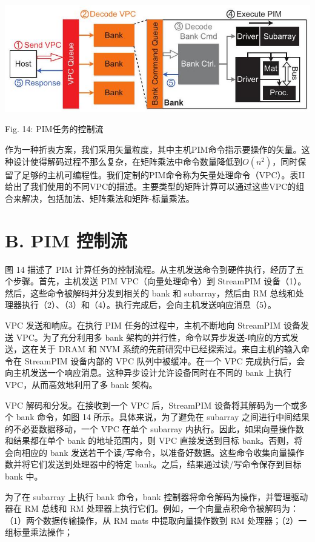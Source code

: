 \documentclass[10pt]{article}
\begin{document}
\begin{center}
\includegraphics[max width=\textwidth]{2024_05_12_abeba8a85da5b5ec4c7bg-08(1)}
\end{center}

Fig. 14: PIM任务的控制流

作为一种折衷方案，我们采用矢量粒度，其中主机PIM命令指示要操作的矢量。这种设计使得解码过程不那么复杂，在矩阵乘法中命令数量降低到$O(n^2)$，同时保留了足够的主机可编程性。我们定制的PIM命令称为矢量处理命令（VPC）。表II给出了我们使用的不同VPC的描述。主要类型的矩阵计算可以通过这些VPC的组合来解决，包括加法、矩阵乘法和矩阵-标量乘法。

\section*{B. PIM 控制流}
图 14 描述了 PIM 计算任务的控制流程。从主机发送命令到硬件执行，经历了五个步骤。首先，主机发送 PIM VPC（向量处理命令）到 StreamPIM 设备（1）。然后，这些命令被解码并分发到相关的 bank 和 subarray，然后由 RM 总线和处理器执行（2）、（3）和（4）。执行完成后，会向主机发送响应消息（5）。

VPC 发送和响应。在执行 PIM 任务的过程中，主机不断地向 StreamPIM 设备发送 VPC。为了充分利用多 bank 架构的并行性，命令以异步发送-响应的方式发送，这在关于 DRAM 和 NVM 系统的先前研究中已经探索过。来自主机的输入命令在 StreamPIM 设备内部的 VPC 队列中被缓冲。在一个 VPC 完成执行后，会向主机发送一个响应消息。这种异步设计允许设备同时在不同的 bank 上执行 VPC，从而高效地利用了多 bank 架构。

VPC 解码和分发。在接收到一个 VPC 后，StreamPIM 设备将其解码为一个或多个 bank 命令，如图 14 所示。具体来说，为了避免在 subarray 之间进行中间结果的不必要数据移动，一个 VPC 在单个 subarray 内执行。因此，如果向量操作数和结果都在单个 bank 的地址范围内，则 VPC 直接发送到目标 bank。否则，将会向相应的 bank 发送若干个读/写命令，以准备好数据。这些命令收集向量操作数并将它们发送到处理器中的特定 bank。之后，结果通过读/写命令保存到目标 bank 中。

为了在 subarray 上执行 bank 命令，bank 控制器将命令解码为操作，并管理驱动器在 RM 总线和 RM 处理器上执行它们。例如，一个向量点积命令被解码为：（1）两个数据传输操作，从 RM mats 中提取向量操作数到 RM 处理器；（2）一组标量乘法操作；
\end{document}
